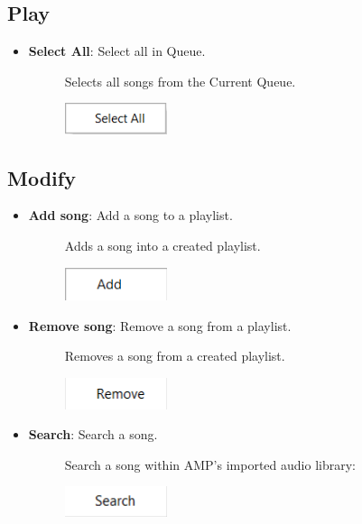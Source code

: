 \documentclass{article}
\begin{document}
\subsection{Play}
    \begin{itemize}
    \item \textbf{Select All}: Select all in Queue.
        \begin{description}
        \item[] Selects all songs from the Current Queue.
        \item[] \includegraphics[width=3cm]{Images/Play Select All.png}
        \end{description}
    \end{itemize}


\subsection{Modify}

\begin{itemize}
    \item \textbf{Add song}: Add a song to a playlist.
    \begin{description}
        \item[] Adds a song into a created playlist.
        \item[] \includegraphics[width=3cm]{Images/Modify Add.png}
    \end{description}
    \item \textbf{Remove song}: Remove a song from a playlist.
    \begin{description}
        \item[] Removes a song from a created playlist.
        \item[] \includegraphics[width=3cm]{Images/Modify Remove.png}
    \end{description}
    \item \textbf{Search}: Search a song.
    \begin{description}
        \item[] Search a song within AMP's imported audio library:
        \item[] \includegraphics[width=3cm]{Images/Modify Search.png}
    \end{description}
\end{itemize}
\end{document}
